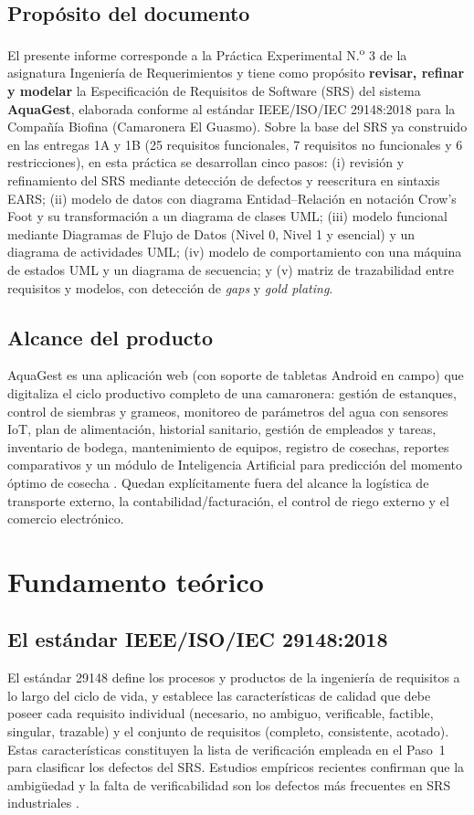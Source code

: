 \documentclass[11pt,a4paper]{article}
\renewcommand{\_}{\textunderscore\allowbreak}
\begin{document}
\subsection{Propósito del documento}
El presente informe corresponde a la Práctica Experimental N.\textsuperscript{o} 3 de la asignatura Ingeniería de Requerimientos y tiene como propósito \textbf{revisar, refinar y modelar} la Especificación de Requisitos de Software (SRS) del sistema \textbf{AquaGest}, elaborada conforme al estándar IEEE/ISO/IEC 29148:2018 \cite{ieee29148} para la Compañía Biofina (Camaronera El Guasmo). Sobre la base del SRS ya construido en las entregas 1A y 1B (25 requisitos funcionales, 7 requisitos no funcionales y 6 restricciones), en esta práctica se desarrollan cinco pasos: (i) revisión y refinamiento del SRS mediante detección de defectos y reescritura en sintaxis EARS; (ii) modelo de datos con diagrama Entidad--Relación en notación Crow's Foot y su transformación a un diagrama de clases UML; (iii) modelo funcional mediante Diagramas de Flujo de Datos (Nivel 0, Nivel 1 y esencial) y un diagrama de actividades UML; (iv) modelo de comportamiento con una máquina de estados UML y un diagrama de secuencia; y (v) matriz de trazabilidad entre requisitos y modelos, con detección de \textit{gaps} y \textit{gold plating}.

\subsection{Alcance del producto}
AquaGest es una aplicación web (con soporte de tabletas Android en campo) que digitaliza el ciclo productivo completo de una camaronera: gestión de estanques, control de siembras y grameos, monitoreo de parámetros del agua con sensores IoT, plan de alimentación, historial sanitario, gestión de empleados y tareas, inventario de bodega, mantenimiento de equipos, registro de cosechas, reportes comparativos y un módulo de Inteligencia Artificial para predicción del momento óptimo de cosecha \cite{zhang2023,pratama2022}. Quedan explícitamente fuera del alcance la logística de transporte externo, la contabilidad/facturación, el control de riego externo y el comercio electrónico.

\section{Fundamento teórico}
\subsection{El estándar IEEE/ISO/IEC 29148:2018}
El estándar 29148 \cite{ieee29148} define los procesos y productos de la ingeniería de requisitos a lo largo del ciclo de vida, y establece las características de calidad que debe poseer cada requisito individual (necesario, no ambiguo, verificable, factible, singular, trazable) y el conjunto de requisitos (completo, consistente, acotado). Estas características constituyen la lista de verificación empleada en el Paso~1 para clasificar los defectos del SRS. Estudios empíricos recientes confirman que la ambigüedad y la falta de verificabilidad son los defectos más frecuentes en SRS industriales \cite{mendez2021,ferrari2022}.
\end{document}
